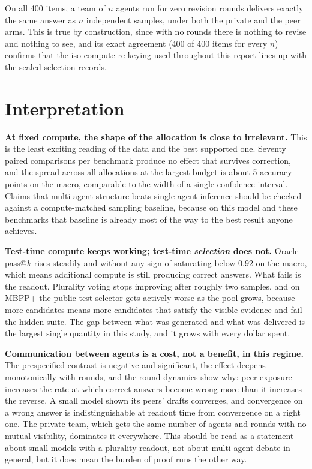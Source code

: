 \documentclass[11pt]{article}
\begin{document}
On all 400 items, a team of $n$ agents run for zero revision rounds delivers exactly the same answer
as $n$ independent samples, under both the private and the peer arms. This is true by construction,
since with no rounds there is nothing to revise and nothing to see, and its exact agreement
(400 of 400 items for every $n$) confirms that the iso-compute re-keying used throughout this report
lines up with the sealed selection records.

\section{Interpretation}

\textbf{At fixed compute, the shape of the allocation is close to irrelevant.} This is the least
exciting reading of the data and the best supported one. Seventy paired comparisons per benchmark
produce no effect that survives correction, and the spread across all allocations at the largest
budget is about 5 accuracy points on the macro, comparable to the width of a single confidence
interval. Claims that multi-agent structure beats single-agent inference should be checked against a
compute-matched sampling baseline, because on this model and these benchmarks that baseline is
already most of the way to the best result anyone achieves.

\textbf{Test-time compute keeps working; test-time \emph{selection} does not.} Oracle pass@$k$
rises steadily and without any sign of saturating below 0.92 on the macro, which means additional
compute is still producing correct answers. What fails is the readout. Plurality voting stops
improving after roughly two samples, and on MBPP+ the public-test selector gets actively worse as
the pool grows, because more candidates means more candidates that satisfy the visible evidence and
fail the hidden suite. The gap between what was generated and what was delivered is the largest
single quantity in this study, and it grows with every dollar spent.

\textbf{Communication between agents is a cost, not a benefit, in this regime.} The prespecified
contrast is negative and significant, the effect deepens monotonically with rounds, and the round
dynamics show why: peer exposure increases the rate at which correct answers become wrong more than
it increases the reverse. A small model shown its peers' drafts converges, and convergence on a
wrong answer is indistinguishable at readout time from convergence on a right one. The private team,
which gets the same number of agents and rounds with no mutual visibility, dominates it everywhere.
This should be read as a statement about small models with a plurality readout, not about
multi-agent debate in general, but it does mean the burden of proof runs the other way.
\end{document}
